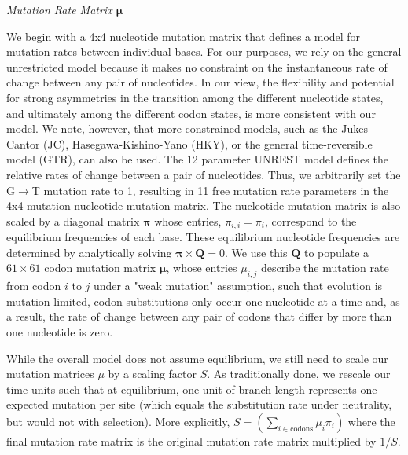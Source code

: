 \documentclass[12pt,letterpaper]{article}
\renewcommand{\subsection}[1]{%
\bigskip
\begin{center}
\begin{large}
\normalfont\itshape #1
\end{large}
\end{center}}
\newcommand{\pimatrix}{\ensuremath{\mathbf{\pi}}\xspace}
\newcommand{\mumatrix}{\ensuremath{\mathbf{\mu}}\xspace}
\newcommand{\Qmatrix}{\ensuremath{\mathbf{Q}}\xspace}
\newcommand{\muij}{\ensuremath{\mu_{i,j}}\xspace}
\begin{document}
\subsection{Mutation Rate Matrix \mumatrix}
We begin with a 4x4 nucleotide mutation matrix that defines a model for mutation rates between individual bases.
For our purposes, we rely on the general unrestricted model\citep[UNREST]{Yang1994} because it makes no constraint on the instantaneous rate of change between any pair of nucleotides.
In our view, the flexibility and potential for strong asymmetries in the transition among the different nucleotide states, and ultimately among the different codon states, is more consistent with our model.
We note, however, that more constrained models, such as the Jukes-Cantor (JC), Hasegawa-Kishino-Yano (HKY), or the general time-reversible model (GTR), can also be used.
The 12 parameter UNREST model defines the relative rates of change between a pair of nucleotides.
Thus, we arbitrarily set the G$\rightarrow$T mutation rate to 1, resulting in 11 free mutation rate parameters in the 4x4 mutation nucleotide mutation matrix.
The nucleotide mutation matrix is also scaled by a diagonal matrix \pimatrix whose entries, $\pi_{i,i} = \pi_i$, correspond to the equilibrium frequencies of each base.
These equilibrium nucleotide frequencies are determined by analytically solving $\pimatrix \times \Qmatrix = 0$.
We use this \Qmatrix to populate a $61 \times 61$ codon mutation matrix $\mumatrix$, whose entries $\muij$ describe the mutation rate from codon $i$ to $j$ under a "weak mutation" assumption, such that evolution is mutation limited, codon substitutions only occur one nucleotide at a time and, as a result, the rate of change between any pair of codons that differ by more than one nucleotide is zero.

While the overall model does not assume equilibrium, we still need to scale our mutation matrices $\mu$ by a scaling factor $S$.
As traditionally done, we rescale our time units such that at equilibrium, one unit of branch length represents one expected mutation per site (which equals the substitution rate under neutrality, but would not with selection).
More explicitly, $ S = \left(\sum_{i \in \text{codons}} \mu_i \pi_i\right)$ where the final mutation rate matrix is the original mutation rate matrix multiplied by $1/S$.
\end{document}
